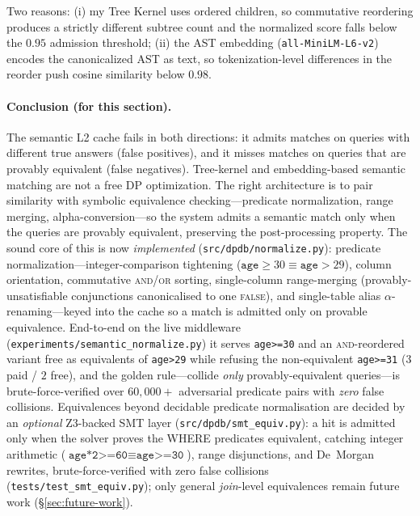 \documentclass[sigconf,nonacm]{acmart}
\begin{document}
Two reasons: (i) my Tree Kernel uses ordered children, so commutative reordering produces a strictly different subtree count and the normalized score falls below the $0.95$ admission threshold; (ii) the AST embedding (\texttt{all-MiniLM-L6-v2}) encodes the canonicalized AST as text, so tokenization-level differences in the reorder push cosine similarity below $0.98$.

\paragraph{Conclusion (for this section).}
The semantic L2 cache fails in both directions: it admits matches on queries with different true answers (false positives), and it misses matches on queries that are provably equivalent (false negatives). Tree-kernel and embedding-based semantic matching are not a free DP optimization. The right architecture is to pair similarity with symbolic equivalence checking---predicate normalization, range merging, alpha-conversion---so the system admits a semantic match only when the queries are provably equivalent, preserving the post-processing property. The sound core of this is now \emph{implemented} (\texttt{src/dpdb/normalize.py}): predicate normalization---integer-comparison tightening ($\texttt{age}\ge30\equiv\texttt{age}>29$), column orientation, commutative \textsc{and}/\textsc{or} sorting, single-column range-merging (provably-unsatisfiable conjunctions canonicalised to one \textsc{false}), and single-table alias $\alpha$-renaming---keyed into the cache so a match is admitted only on provable equivalence. End-to-end on the live middleware (\texttt{experiments/semantic\_normalize.py}) it serves \texttt{age>=30} and an \textsc{and}-reordered variant free as equivalents of \texttt{age>29} while refusing the non-equivalent \texttt{age>=31} ($3$ paid / $2$ free), and the golden rule---collide \emph{only} provably-equivalent queries---is brute-force-verified over $60{,}000{+}$ adversarial predicate pairs with \emph{zero} false collisions. Equivalences beyond decidable predicate normalisation are decided by an \emph{optional} Z3-backed SMT layer (\texttt{src/dpdb/smt\_equiv.py}): a hit is admitted only when the solver proves the WHERE predicates equivalent, catching integer arithmetic ($\texttt{age*2>=60}\equiv\texttt{age>=30}$), range disjunctions, and De~Morgan rewrites, brute-force-verified with zero false collisions (\texttt{tests/test\_smt\_equiv.py}); only general \emph{join}-level equivalences remain future work (\S\ref{sec:future-work}).
\end{document}
